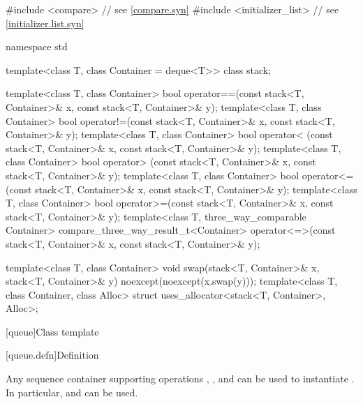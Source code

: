 %
\begin{codeblock}
#include <compare>              // see \ref{compare.syn}
#include <initializer_list>     // see \ref{initializer.list.syn}

namespace std {
  template<class T, class Container = deque<T>> class stack;

  template<class T, class Container>
    bool operator==(const stack<T, Container>& x, const stack<T, Container>& y);
  template<class T, class Container>
    bool operator!=(const stack<T, Container>& x, const stack<T, Container>& y);
  template<class T, class Container>
    bool operator< (const stack<T, Container>& x, const stack<T, Container>& y);
  template<class T, class Container>
    bool operator> (const stack<T, Container>& x, const stack<T, Container>& y);
  template<class T, class Container>
    bool operator<=(const stack<T, Container>& x, const stack<T, Container>& y);
  template<class T, class Container>
    bool operator>=(const stack<T, Container>& x, const stack<T, Container>& y);
  template<class T, three_way_comparable Container>
    compare_three_way_result_t<Container>
      operator<=>(const stack<T, Container>& x, const stack<T, Container>& y);

  template<class T, class Container>
    void swap(stack<T, Container>& x, stack<T, Container>& y) noexcept(noexcept(x.swap(y)));
  template<class T, class Container, class Alloc>
    struct uses_allocator<stack<T, Container>, Alloc>;
}
\end{codeblock}

[queue]{Class template }

[queue.defn]{Definition}

\pnum
{}%
Any sequence container supporting operations
,
,
and
can be used to instantiate
.
In particular,
and
can be used.

